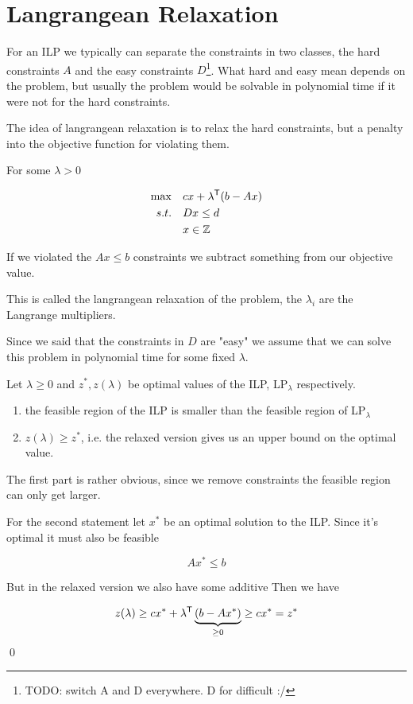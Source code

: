 \section{Langrangean Relaxation}

For an ILP we typically can separate the constraints in two classes, the hard constraints $A$ and the easy constraints $D$\footnote{TODO: switch A and D everywhere. D for difficult :/}. What hard and easy mean depends on the problem, but usually the problem would be solvable in polynomial time if it were not for the hard constraints.

The idea of langrangean relaxation is to relax the hard constraints, but  a penalty into the objective function for violating them.

For some $\lambda>0$

\begin{align*}
\max \quad & c x + {\lambda}^\text{\upshape \sffamily T}(b-Ax)\\
s.t. \quad & Dx \leq d\\
	& x\in \mathbb{Z}
\end{align*}

If we violated the $Ax\leq b$ constraints we subtract something from our objective value.

This is called the langrangean relaxation of the problem, the $\lambda_i$ are the Langrange multipliers.

Since we said that the constraints in $D$ are "easy" we assume that we can solve this problem in polynomial time for some fixed $\lambda$.

\begin{thm} Let $\lambda \geq 0$ and $z^*,z(\lambda)$ be optimal values of the ILP, LP$_\lambda$ respectively.

\begin{enumerate}
\item the feasible region of the ILP is smaller than the feasible region of LP$_\lambda$
\item $z(\lambda)\geq z^*$, i.e. the relaxed version gives us an upper bound on the optimal value.
\end{enumerate}
\end{thm}

\begin{pr} The first part is rather obvious, since we remove constraints the feasible region can only get larger.

For the second statement let $x^*$ be an optimal solution to the ILP. Since it's optimal it must also be feasible

\[Ax^*\leq b\]

But in the relaxed version we also have some additive Then we have

\[z(\lambda) \geq cx^* + {\lambda}^\text{\upshape \sffamily T}\underbrace{(b-Ax^*)}_{\geq 0} \geq cx^*=z^*\]
\qed \end{pr}

